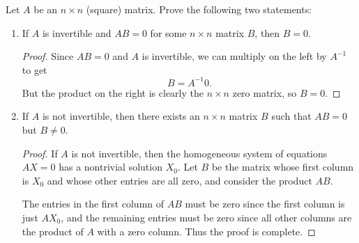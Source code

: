  Let $A$ be an $n\times n$ (square) matrix. Prove the
following two statements:
\begin{enumerate}
\item If $A$ is invertible and $AB = 0$ for some $n\times n$ matrix
  $B$, then $B = 0$.
  \begin{proof}
    Since $AB = 0$ and $A$ is invertible, we can multiply on the left
    by $A^{-1}$ to get
    \begin{equation*}
      B = A^{-1}0.
    \end{equation*}
    But the product on the right is clearly the $n\times n$ zero
    matrix, so $B = 0$.
  \end{proof}
\item If $A$ is not invertible, then there exists an $n\times n$
  matrix $B$ such that $AB = 0$ but $B\neq0$.
  \begin{proof}
    If $A$ is not invertible, then the homogeneous system of equations
    $AX = 0$ has a nontrivial solution $X_0$. Let $B$ be the matrix
    whose first column is $X_0$ and whose other entries are all zero,
    and consider the product $AB$.

    The entries in the first column of $AB$ must be zero since the
    first column is just $AX_0$, and the remaining entries must be
    zero since all other columns are the product of $A$ with a zero
    column. Thus the proof is complete.
  \end{proof}
\end{enumerate}


